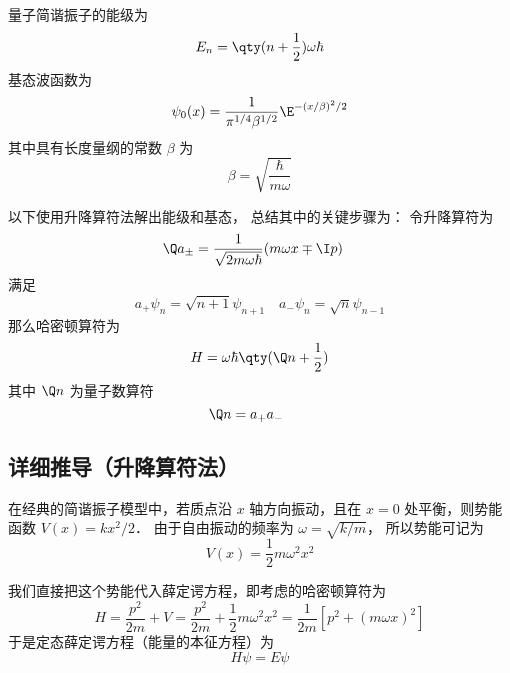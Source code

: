 
\begin{issues}
\issueAbstract
\end{issues}



量子简谐振子的能级为
\begin{equation}
E_n = \qty(n+\frac12)\omega \hbar
\end{equation}
基态波函数为
\begin{equation}
\psi_0 (x) = \frac{1}{\pi^{1/4} \beta^{1/2}} \E^{-(x/\beta)^2/2}
\end{equation}
其中具有长度量纲的常数 $\beta$ 为
\begin{equation}
\beta  = \sqrt{\frac{\hbar}{m\omega}}
\end{equation}

以下使用升降算符法解出能级和基态， 总结其中的关键步骤为： 令升降算符为
\begin{equation}
\Q a_\pm = \frac{1}{\sqrt{2m\omega\hbar}} (m\omega x \mp \I p) \quad
\end{equation}
满足
\begin{equation}
a_+ \psi_n = \sqrt{n + 1} \psi_{n+1}
\quad
a_- \psi_n = \sqrt n \psi_{n-1}
\end{equation}
那么哈密顿算符为
\begin{equation}
H = \omega\hbar \qty(\Q n + \frac12)
\end{equation}
其中 $\Q n$ 为量子数算符
\begin{equation}
\Q n = a_+ a_ - \qquad
\end{equation}

\subsection{详细推导（升降算符法）}

在经典的简谐振子模型中，若质点沿 $x$ 轴方向振动，且在 $x = 0$ 处平衡，则势能函数 $V(x) = k x^2/2$． 由于自由振动的频率为 $\omega = \sqrt{k/m}$， 所以势能可记为
\begin{equation}
V(x) = \frac12 m \omega^2 x^2
\end{equation}

我们直接把这个势能代入薛定谔方程，即考虑的哈密顿算符为
\begin{equation}
H = \frac{p^2}{2m} + V = \frac{p^2}{2m} + \frac12 m\omega^2 x^2 = \frac{1}{2m} [p^2 + (m\omega x)^2]
\end{equation}
于是定态薛定谔方程（能量的本征方程）为
\begin{equation}\label{QSHOop_eq6}
H\psi  = E\psi
\end{equation}

